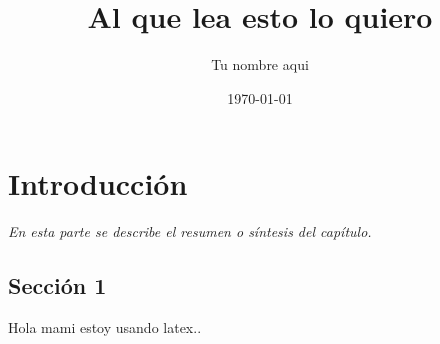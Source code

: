 \documentclass[]{book}
\title{\bf Al que lea esto lo quiero}
\author{Tu nombre aqui}
\date{\today}
\begin{document}
\frontmatter
\maketitle
\tableofcontents
\mainmatter
\chapter{Introducción}
\begin{center}
\textit{En esta parte se describe el resumen o síntesis
del capítulo.}
\end{center}
\section{Sección 1}
Hola mami estoy usando latex..
\end{document}
